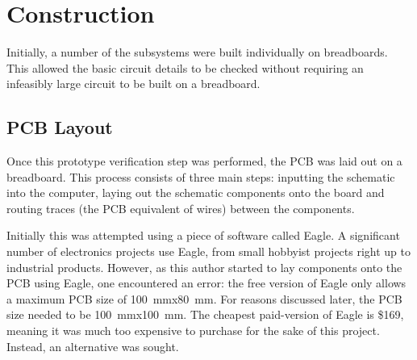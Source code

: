 



\section{Construction}
Initially, a number of the subsystems were built individually on breadboards.
This allowed the basic circuit details to be checked without requiring an
infeasibly large circuit to be built on a breadboard. 

\subsection{PCB Layout}
Once this prototype verification step was performed, the PCB was laid out on a
breadboard. This process consists of three main steps: inputting the schematic
into the computer, laying out the schematic components onto the board and
routing traces (the PCB equivalent of wires) between the components.

Initially this was attempted using a piece of software called Eagle. A
significant number of electronics projects use Eagle, from small hobbyist
projects right up to industrial products. However, as this author started to lay
components onto the PCB using Eagle, one encountered an error: the free version
of Eagle only allows a maximum PCB size of \SI{100}{\mm}x\SI{80}{\mm}. For
reasons discussed later, the PCB size needed to be \SI{100}{\mm}x\SI{100}{\mm}.
The cheapest paid-version of Eagle is \$169, meaning it was much too expensive
to purchase for the sake of this project. Instead, an alternative was sought.

